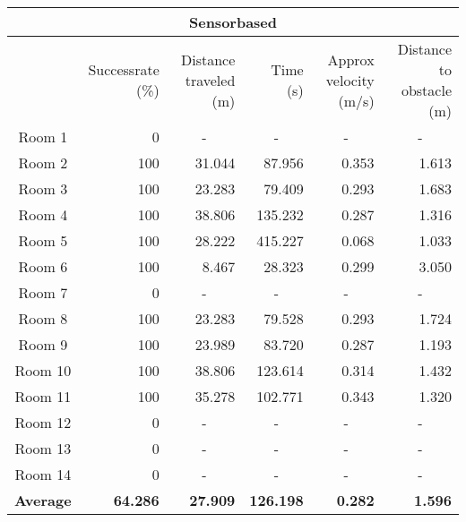 \documentclass[../Head/Main.tex]{subfiles}
\begin{document}
	\begin{tabular}{| c | r | r | r | r | r |}
		\hline
		\multicolumn{6}{|c|}{\textbf{Sensorbased}} \\ \hline
		 & Successrate (\%) & Distance traveled (m) & Time (s) & Approx velocity (m/s) & Distance to obstacle (m) \\ \hline
		Room 1 & 0 & \multicolumn{1}{c|}{-} & \multicolumn{1}{c|}{-} & \multicolumn{1}{c|}{-} & \multicolumn{1}{c|}{-} \\ \hline
		Room 2 & 100 & 31.044 & 87.956 & 0.353 & 1.613 \\ \hline
		Room 3 & 100 & 23.283 & 79.409 & 0.293 & 1.683 \\ \hline
		Room 4 & 100 & 38.806 & 135.232 & 0.287 & 1.316 \\ \hline
		Room 5 & 100 & 28.222 & 415.227 & 0.068 & 1.033 \\ \hline
		Room 6 & 100 & 8.467 & 28.323 & 0.299 & 3.050 \\ \hline
		Room 7 & 0 & \multicolumn{1}{c|}{-} & \multicolumn{1}{c|}{-} & \multicolumn{1}{c|}{-} & \multicolumn{1}{c|}{-} \\ \hline
		Room 8 & 100 & 23.283 & 79.528 & 0.293 & 1.724 \\ \hline
		Room 9 & 100 & 23.989 & 83.720 & 0.287 & 1.193 \\ \hline
		Room 10 & 100 & 38.806 & 123.614 & 0.314 & 1.432 \\ \hline
		Room 11 & 100 & 35.278 & 102.771 & 0.343 & 1.320 \\ \hline
		Room 12 & 0 & \multicolumn{1}{c|}{-} & \multicolumn{1}{c|}{-} & \multicolumn{1}{c|}{-} & \multicolumn{1}{c|}{-} \\ \hline
		Room 13 & 0 & \multicolumn{1}{c|}{-} & \multicolumn{1}{c|}{-} & \multicolumn{1}{c|}{-} & \multicolumn{1}{c|}{-} \\ \hline
		Room 14 & 0 & \multicolumn{1}{c|}{-} & \multicolumn{1}{c|}{-} & \multicolumn{1}{c|}{-} & \multicolumn{1}{c|}{-} \\ \hline
		\textbf{Average} & \textbf{64.286} & \textbf{27.909} & \textbf{126.198} & \textbf{0.282} & \textbf{1.596} \\ \hline
\end{tabular}
\end{document}
